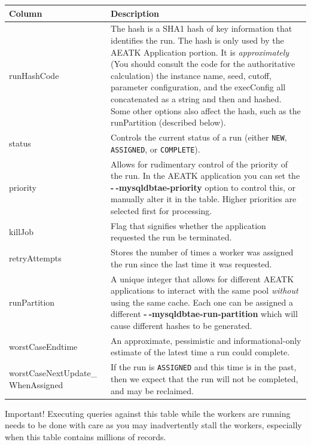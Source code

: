 \documentclass[11pt,letterpaper,oneside]{article}
\begin{document}
\begin{description}
\begin{center}
\begin{tabular}{p{3.5cm} | p{11.5cm} }
Column & Description \\
\hline
\hline
runHashCode & The hash is a SHA1 hash of key information that identifies the run. The hash is only used by the AEATK Application portion. It is \emph{approximately} (You should consult the code for the authoritative calculation) the instance name, seed, cutoff, parameter configuration, and the execConfig all concatenated as a string and then and hashed. Some other options also affect the hash, such as the runPartition (described below).\\
\hline 
status & Controls the current status of a run (either \texttt{NEW}, \texttt{ASSIGNED}, or \texttt{COMPLETE}). \\
\hline
priority & Allows for rudimentary control of the priority of the run. In the AEATK application you can set the \textbf{-$~\!$-mysqldbtae-priority} option to control this, or manually alter it in the table. Higher priorities are selected first for processing.\\
\hline
killJob & Flag that signifies whether the application requested the run be terminated. \\
\hline 
retryAttempts & Stores the number of times a worker was assigned the run since the last time it was requested. \\
\hline 
runPartition & A unique integer that allows for different AEATK applications to interact with the same pool \emph{without} using the same cache. Each one can be assigned a different \textbf{-$~\!$-mysqldbtae-run-partition} which will cause different hashes to be generated.  \\
\hline
worstCaseEndtime & An approximate, pessimistic and informational-only estimate of the latest time a run could complete. \\
\hline
worstCaseNextUpdate\_ WhenAssigned & If the run is \texttt{ASSIGNED} and this time is in the past, then we expect that the run will not be completed, and may be reclaimed. \\
\hline
\end{tabular}
\end{center}

\begin{bclogo}[logo=\bcattention, couleurBarre=red, noborder=true]{Important!}
Executing queries against this table while the workers are running needs to be done with care as you may inadvertently stall the workers, especially when this table contains millions of records. 
\end{bclogo}



\end{description}
\end{document}

